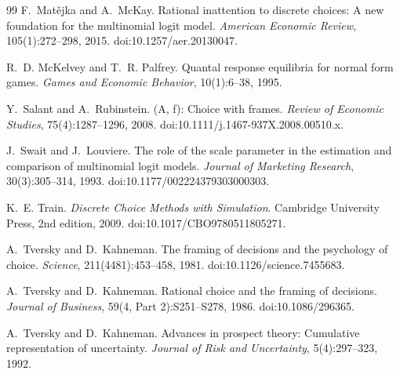 \documentclass[11pt]{article}
\theoremstyle{definition}
\begin{document}
\begin{thebibliography}{99}
F.~Mat{\v e}jka and A.~McKay.
\newblock Rational inattention to discrete choices: A new foundation for the multinomial logit model.
\newblock \emph{American Economic Review}, 105(1):272--298, 2015.
\newblock doi:10.1257/aer.20130047.

R.~D. McKelvey and T.~R. Palfrey.
\newblock Quantal response equilibria for normal form games.
\newblock \emph{Games and Economic Behavior}, 10(1):6--38, 1995. %

Y.~Salant and A.~Rubinstein.
\newblock ({A}, f): Choice with frames.
\newblock \emph{Review of Economic Studies}, 75(4):1287--1296, 2008.
\newblock doi:10.1111/j.1467-937X.2008.00510.x.

J.~Swait and J.~Louviere.
\newblock The role of the scale parameter in the estimation and comparison of multinomial logit models.
\newblock \emph{Journal of Marketing Research}, 30(3):305--314, 1993.
\newblock doi:10.1177/002224379303000303.

K.~E. Train.
\newblock \emph{Discrete Choice Methods with Simulation}.
\newblock Cambridge University Press, 2nd edition, 2009.
\newblock doi:10.1017/CBO9780511805271.

A.~Tversky and D.~Kahneman.
\newblock The framing of decisions and the psychology of choice.
\newblock \emph{Science}, 211(4481):453--458, 1981.
\newblock doi:10.1126/science.7455683.

A.~Tversky and D.~Kahneman.
\newblock Rational choice and the framing of decisions.
\newblock \emph{Journal of Business}, 59(4, Part 2):S251--S278, 1986.
\newblock doi:10.1086/296365.

A.~Tversky and D.~Kahneman.
\newblock Advances in prospect theory: Cumulative representation of uncertainty.
\newblock \emph{Journal of Risk and Uncertainty}, 5(4):297--323, 1992.

\end{thebibliography}
\end{document}
